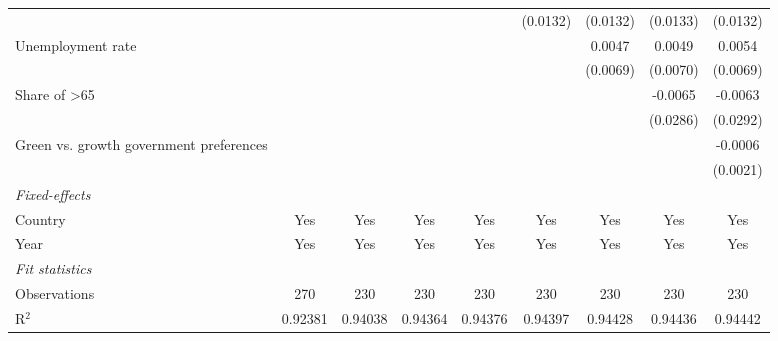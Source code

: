 \begin{table}[htbp]
\begin{tabular}{lcccccccc}
                                                                       &          &          &                &                & (0.0132)       & (0.0132)        & (0.0133)        & (0.0132)\\   
      Unemployment rate                                                &          &          &                &                &                & 0.0047          & 0.0049          & 0.0054\\   
                                                                       &          &          &                &                &                & (0.0069)        & (0.0070)        & (0.0069)\\   
      Share of >65                                                     &          &          &                &                &                &                 & -0.0065         & -0.0063\\   
                                                                       &          &          &                &                &                &                 & (0.0286)        & (0.0292)\\   
      Green vs. growth government preferences                          &          &          &                &                &                &                 &                 & -0.0006\\   
                                                                       &          &          &                &                &                &                 &                 & (0.0021)\\   
      \midrule
      \emph{Fixed-effects}\\
      Country                                                          & Yes      & Yes      & Yes            & Yes            & Yes            & Yes             & Yes             & Yes\\  
      Year                                                             & Yes      & Yes      & Yes            & Yes            & Yes            & Yes             & Yes             & Yes\\  
      \midrule
      \emph{Fit statistics}\\
      Observations                                                     & 270      & 230      & 230            & 230            & 230            & 230             & 230             & 230\\  
      R$^2$                                                            & 0.92381  & 0.94038  & 0.94364        & 0.94376        & 0.94397        & 0.94428         & 0.94436         & 0.94442\\  

\end{tabular}
\end{table}
